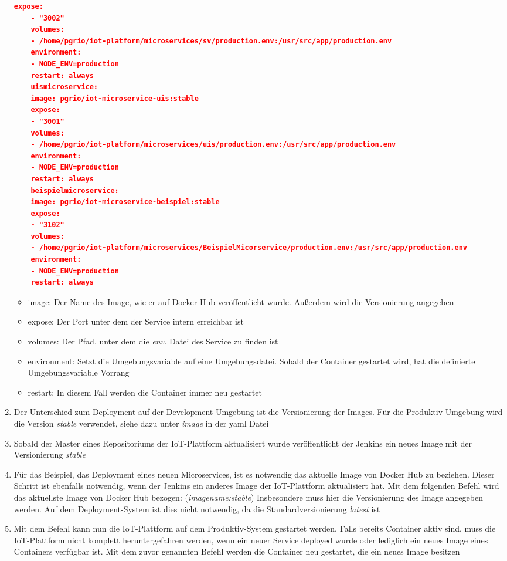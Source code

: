 \begin{enumerate}
\begin{lstlisting}[language=json,basicstyle=\footnotesize]
	expose:
	- "3002"
	volumes:
	- /home/pgrio/iot-platform/microservices/sv/production.env:/usr/src/app/production.env
	environment:
	- NODE_ENV=production
	restart: always
	uismicroservice:
	image: pgrio/iot-microservice-uis:stable
	expose:
	- "3001"
	volumes:
	- /home/pgrio/iot-platform/microservices/uis/production.env:/usr/src/app/production.env
	environment:
	- NODE_ENV=production
	restart: always
	beispielmicroservice:
	image: pgrio/iot-microservice-beispiel:stable
	expose:
	- "3102"
	volumes:
	- /home/pgrio/iot-platform/microservices/BeispielMicorservice/production.env:/usr/src/app/production.env
	environment:
	- NODE_ENV=production
	restart: always
	\end{lstlisting}
	\begin{itemize}
		\item image: Der Name des Image, wie er auf Docker-Hub veröffentlicht wurde. Außerdem wird die Versionierung angegeben
		\item expose: Der Port unter dem der Service intern erreichbar ist
		\item volumes: Der Pfad, unter dem die \textit{env.} Datei des Service zu finden ist
		\item environment: Setzt die Umgebungsvariable auf eine Umgebungsdatei. Sobald der Container gestartet wird, hat die definierte Umgebungsvariable Vorrang
		\item restart: In diesem Fall werden die Container immer neu gestartet
	\end{itemize}
	\item Der Unterschied zum Deployment auf der Development Umgebung ist die Versionierung der Images. Für die Produktiv Umgebung wird die Version \textit{stable} verwendet, siehe dazu unter \textit{image} in der yaml Datei
	\item Sobald der Master eines Repositoriums der IoT-Plattform aktualisiert wurde veröffentlicht der Jenkins ein neues Image mit der Versionierung \textit{stable}
	\item Für das Beispiel, das Deployment eines neuen Microservices, ist es notwendig das aktuelle Image von Docker Hub zu beziehen. Dieser Schritt ist ebenfalls notwendig, wenn der Jenkins ein anderes Image der IoT-Plattform aktualisiert hat. Mit dem folgenden Befehl wird das aktuellste Image von Docker Hub bezogen: \newline
	 (\textit{imagename:stable})
	Insbesondere muss hier die Versionierung des Image angegeben werden. Auf dem Deployment-System ist dies nicht notwendig, da die Standardversionierung \textit{latest} ist
	\item Mit dem Befehl  kann nun die IoT-Plattform auf dem Produktiv-System gestartet werden. \newline
	Falls bereits Container aktiv sind, muss die IoT-Plattform nicht komplett heruntergefahren werden, wenn ein neuer Service deployed wurde oder lediglich ein neues Image eines Containers verfügbar ist. Mit dem zuvor genannten Befehl werden die Container neu gestartet, die ein neues Image besitzen
\end{enumerate}